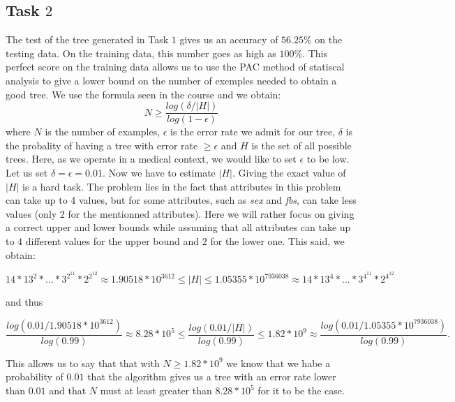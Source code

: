 \documentclass[french]{article}
\begin{document}
		
\subsection{Task $2$}
	The test of the tree generated in Task $1$ gives us an accuracy of $56.25\%$ on the testing data. On the training data, this number goes as high as $100\%$. This perfect score on the training data allows us to use the PAC method of statiscal analysis to give a lower bound on the number of exemples needed to obtain a good tree. We use the formula seen in the course and we obtain:
	$$N\geq\frac{log(\delta/|H|)}{log(1-\epsilon)}$$
where $N$ is the number of examples, $\epsilon$ is the error rate we admit for our tree, $\delta$ is the probality of having a tree with error rate $\geq\epsilon$ and $H$ is the set of all possible trees. Here, as we operate in a medical context, we would like to set $\epsilon$  to be low. Let us set $\delta=\epsilon= 0.01$. Now we have to estimate $|H|$. Giving the exact value of $|H|$ is a hard task. The problem lies in the fact that attributes in this problem can take up to 4 values, but for some attributes, such as \emph{sex} and \emph{fbs}, can take less values (only 2 for the mentionned attributes). Here we will rather focus on giving a correct upper and lower bounds while assuming that all attributes can take up to $4$ different values for the upper bound and $2$ for the lower one. This said, we obtain:
	
	$$14*13^2*\ldots*3^{2^{11}}*2^{2^{12}}\approx1.90518*10^{3612}\leq|H|\leq 1.05355*10^{7936038}\approx 14*13^4*\ldots*3^{4^{11}}*2^{4^{12}}  $$
	
	and thus 
	
	$$\frac{log(0.01/1.90518*10^{3612})}{log(0.99)}\approx8.28*10^5\leq\frac{log(0.01/|H|)}{log(0.99)}\leq1.82*10^9\approx\frac{log(0.01/1.05355*10^{7936038})}{log(0.99)}.$$

This allows us to say that that with $N\geq1.82*10^9$ we know that we habe a probability of $0.01$ that the algorithm gives us a tree with an error rate lower than $0.01$ and that $N$ must at least greater than $8.28*10^5$ for it to be the case.
\end{document}
